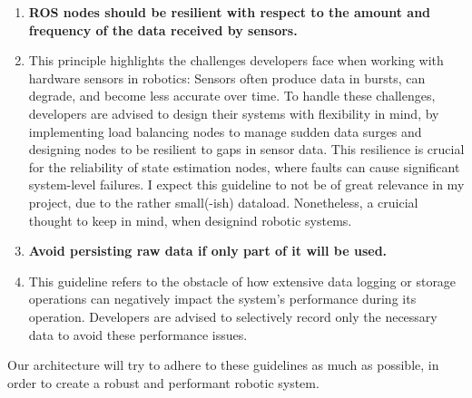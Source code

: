 \documentclass[]{article}
\begin{document}
\begin{enumerate}[leftmargin=9mm, align=left]
		\item \textbf{ROS nodes should be resilient with respect to the amount and frequency of the data received by sensors.} 
		\item[] This principle highlights the challenges developers face when working with hardware sensors in robotics: Sensors often produce data in bursts, can degrade, and become less accurate over time. To handle these challenges, developers are advised to design their systems with flexibility in mind, by implementing load balancing nodes to manage sudden data surges and designing nodes to be resilient to gaps in sensor data. This resilience is crucial for the reliability of state estimation nodes, where faults can cause significant system-level failures. I expect this guideline to not be of great relevance in my project, due to the rather small(-ish) dataload. Nonetheless, a cruicial thought to keep in mind, when designind robotic systems. \autocite{malavoltaHowYouArchitect2020}
		
		\item \textbf{Avoid persisting raw data if only part of it will be used.}
		\item[] This guideline refers to the obstacle of how extensive data logging or storage operations can negatively impact the system's performance during its operation. Developers are advised to selectively record only the necessary data to avoid these performance issues. \autocite{malavoltaHowYouArchitect2020}
		
		
	\end{enumerate}
	
	Our architecture will try to adhere to these guidelines as much as possible, in order to create a robust and performant robotic system.
	
	
\end{document}
